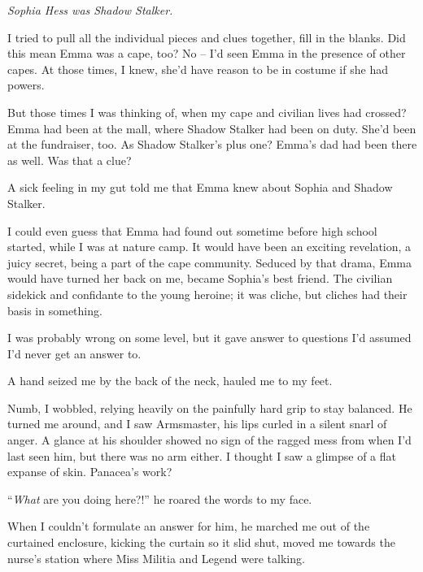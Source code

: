 





\emph{Sophia Hess was Shadow Stalker. }



I tried to pull all the individual pieces and clues together, fill in the blanks.  Did this mean Emma was a cape, too?  No – I'd seen Emma in the presence of other capes.  At those times, I knew, she'd have reason to be in costume if she had powers.



But those times I was thinking of, when my cape and civilian lives had crossed?  Emma had been at the mall, where Shadow Stalker had been on duty.  She'd been at the fundraiser, too.  As Shadow Stalker's plus one?  Emma's dad had been there as well.  Was that a clue?



A sick feeling in my gut told me that Emma knew about Sophia and Shadow Stalker.



I could even guess that Emma had found out sometime before high school started, while I was at nature camp.  It would have been an exciting revelation, a juicy secret, being a part of the cape community.  Seduced by that drama, Emma would have turned her back on me, became Sophia's best friend.  The civilian sidekick and confidante to the young heroine; it was cliche, but cliches had their basis in something.



I was probably wrong on some level, but it gave answer to questions I'd assumed I'd never get an answer to.



A  hand seized me by the back of the neck, hauled me to my feet.



Numb, I wobbled, relying heavily on the painfully hard grip to stay balanced.  He turned me around, and I saw Armsmaster, his lips curled in a silent snarl of anger.   A glance at his shoulder showed no sign of the ragged mess from when I'd last seen him, but there was no arm either.  I thought I saw a glimpse of a flat expanse of skin.  Panacea's work?



``\emph{What} are you doing here?!'' he roared the words to my face.



When I couldn't formulate an answer for him, he marched me out of the curtained enclosure, kicking the curtain so it slid shut, moved me towards the nurse's station where Miss Militia and Legend were talking.



